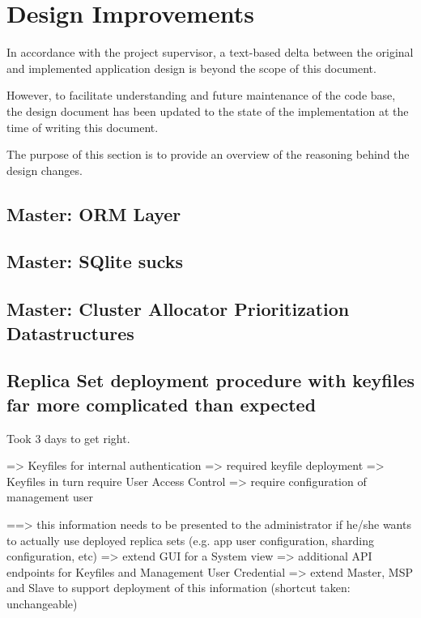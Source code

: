\section{Design Improvements}

In accordance with the project supervisor, a text-based delta between the original and implemented application design
is beyond the scope of this document.

However, to facilitate understanding and future maintenance of the code base, the design document has been updated to the state of
the implementation at the time of writing this document.

The purpose of this section is to provide an overview of the reasoning behind the design changes.


\subsection{Master: ORM Layer}

\subsection{Master: SQlite sucks}

\subsection{Master: Cluster Allocator Prioritization Datastructures}

\subsection{Replica Set deployment procedure with keyfiles far more complicated than expected}

Took 3 days to get right.

=> Keyfiles for internal authentication => required keyfile deployment
=> Keyfiles in turn require User Access Control  => require configuration of management user

==> this information needs to be presented to the administrator if he/she wants to actually use deployed replica sets
    (e.g. app user configuration, sharding configuration, etc)
    => extend GUI for a System view
      => additional API endpoints for Keyfiles and Management User Credential
    => extend Master, MSP and Slave to support deployment of this information
       (shortcut taken: unchangeable)

